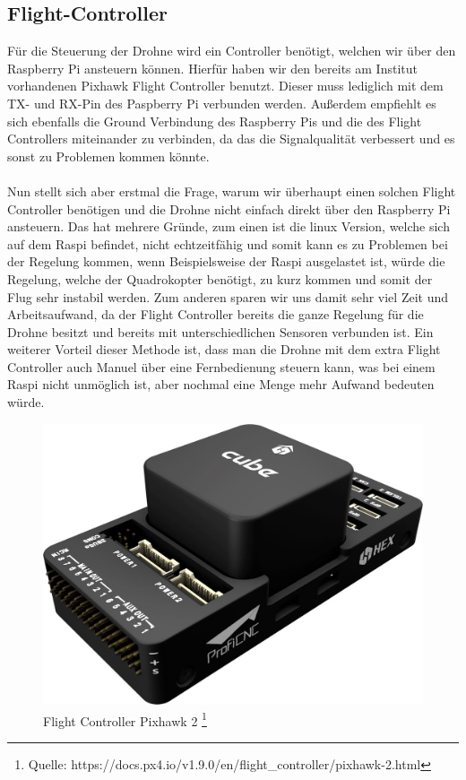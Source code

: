 \subsection{Flight-Controller}
Für die Steuerung der Drohne wird ein Controller benötigt, welchen wir über den Raspberry Pi ansteuern können. Hierfür haben wir den bereits am Institut vorhandenen Pixhawk Flight Controller benutzt. Dieser muss lediglich mit dem TX- und RX-Pin des Paspberry Pi verbunden werden. Außerdem empfiehlt es sich ebenfalls die Ground Verbindung des Raspberry Pis und die des Flight Controllers miteinander zu verbinden, da das die Signalqualität verbessert und es sonst zu Problemen kommen könnte.\\
\\
Nun stellt sich aber erstmal die Frage, warum wir überhaupt einen solchen Flight Controller benötigen und die Drohne nicht einfach direkt über den Raspberry Pi ansteuern. Das hat mehrere Gründe, zum einen ist die linux Version, welche sich auf dem Raspi befindet, nicht echtzeitfähig und somit kann es zu Problemen bei der Regelung kommen, wenn Beispielsweise der Raspi ausgelastet ist, würde die Regelung, welche der Quadrokopter benötigt, zu kurz kommen und somit der Flug sehr instabil werden. Zum anderen sparen wir uns damit sehr viel Zeit und Arbeitsaufwand, da der Flight Controller bereits die ganze Regelung für die Drohne besitzt und bereits mit unterschiedlichen Sensoren verbunden ist. Ein weiterer Vorteil dieser Methode ist, dass man die Drohne mit dem extra Flight Controller auch Manuel über eine Fernbedienung steuern kann, was bei einem Raspi nicht unmöglich ist, aber nochmal eine Menge mehr Aufwand bedeuten würde.
\begin{figure}[h]
	\centering
	\includegraphics[scale=0.35]{"Grafiken/pixhawk2.png"}
	\caption{Flight Controller Pixhawk 2 \footnote{Quelle: https://docs.px4.io/v1.9.0/en/flight\_controller/pixhawk-2.html}}
	\label{fig:meine-grafik}
\end{figure}
